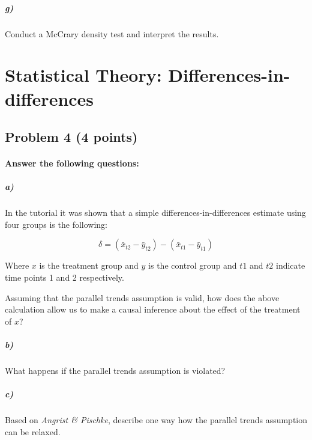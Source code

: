 \documentclass[12pt]{article}
\begin{document}
\subparagraph{g)} Conduct a McCrary density test and interpret the results.




\section*{Statistical Theory: Differences-in-differences}

\subsection*{Problem 4 (4 points)}

\paragraph{Answer the following questions:}

\subparagraph*{a)} In the tutorial it was shown that a simple differences-in-differences estimate using four groups is the following:

$$ \delta = (\bar{x} _{t2} - \bar{y} _{t2}) - (\bar{x} _{t1} - \bar{y} _{t1}) $$


Where $x$ is the treatment group and $y$ is the control group and $t1$ and $t2$ indicate time points 1 and 2 respectively.

Assuming that the parallel trends assumption is valid, how does the above calculation allow us to make a causal inference about the effect of the treatment of $x$?

\subparagraph*{b)} What happens if the parallel trends assumption is violated?

\subparagraph*{c)} Based on \textit{Angrist \& Pischke}, describe one way how the parallel trends assumption can be relaxed.
\end{document}
